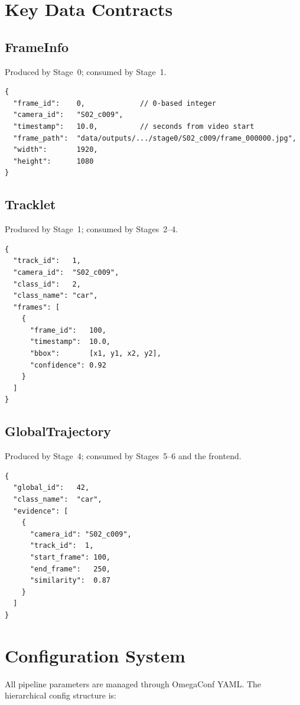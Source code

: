 \section{Key Data Contracts}

\subsection{FrameInfo}

Produced by Stage~0; consumed by Stage~1.

\begin{verbatim}
{
  "frame_id":    0,             // 0-based integer
  "camera_id":   "S02_c009",
  "timestamp":   10.0,          // seconds from video start
  "frame_path":  "data/outputs/.../stage0/S02_c009/frame_000000.jpg",
  "width":       1920,
  "height":      1080
}
\end{verbatim}

\subsection{Tracklet}

Produced by Stage~1; consumed by Stages~2--4.

\begin{verbatim}
{
  "track_id":   1,
  "camera_id":  "S02_c009",
  "class_id":   2,
  "class_name": "car",
  "frames": [
    {
      "frame_id":   100,
      "timestamp":  10.0,
      "bbox":       [x1, y1, x2, y2],
      "confidence": 0.92
    }
  ]
}
\end{verbatim}

\subsection{GlobalTrajectory}

Produced by Stage~4; consumed by Stages~5--6 and the frontend.

\begin{verbatim}
{
  "global_id":   42,
  "class_name":  "car",
  "evidence": [
    {
      "camera_id": "S02_c009",
      "track_id":  1,
      "start_frame": 100,
      "end_frame":   250,
      "similarity":  0.87
    }
  ]
}
\end{verbatim}

\section{Configuration System}

All pipeline parameters are managed through OmegaConf YAML. The hierarchical config structure is:

